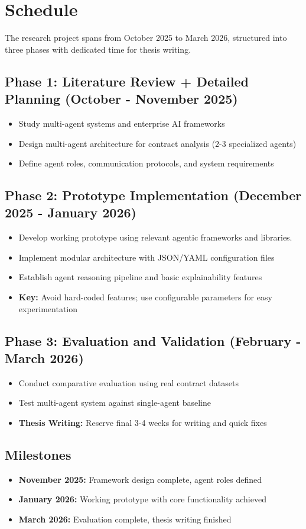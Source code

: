 
\section{Schedule}\label{section:schedule}

The research project spans from October 2025 to March 2026, structured into three phases with dedicated time for thesis writing.

\subsection{Phase 1: Literature Review + Detailed Planning (October - November 2025)}

\begin{itemize}
    \item Study multi-agent systems and enterprise AI frameworks
    \item Design multi-agent architecture for contract analysis (2-3 specialized agents)
    \item Define agent roles, communication protocols, and system requirements
\end{itemize}

\subsection{Phase 2: Prototype Implementation (December 2025 - January 2026)}

\begin{itemize}
    \item Develop working prototype using relevant agentic frameworks and libraries.
    \item Implement modular architecture with JSON/YAML configuration files
    \item Establish agent reasoning pipeline and basic explainability features
    \item \textbf{Key:} Avoid hard-coded features; use configurable parameters for easy experimentation
\end{itemize}

\subsection{Phase 3: Evaluation and Validation (February - March 2026)}

\begin{itemize}
    \item Conduct comparative evaluation using real contract datasets
    \item Test multi-agent system against single-agent baseline
    \item \textbf{Thesis Writing:} Reserve final 3-4 weeks for writing and quick fixes
\end{itemize}

\subsection{Milestones}

\begin{itemize}
    \item \textbf{November 2025:} Framework design complete, agent roles defined
    \item \textbf{January 2026:} Working prototype with core functionality achieved
    \item \textbf{March 2026:} Evaluation complete, thesis writing finished
\end{itemize}
